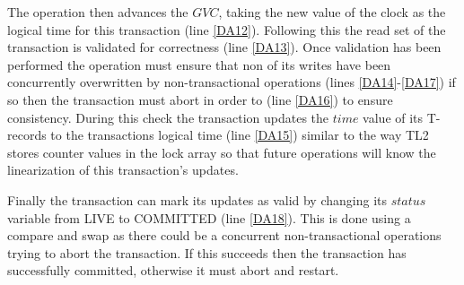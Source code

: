 \documentclass[11pt,letterpaper]{article}
\begin{document}
The operation then advances the $\mathit{GVC}$, taking the
new value of the clock as the logical time for this transaction (line \ref{DA12}).
Following this the read set of the transaction is validated for
correctness (line \ref{DA13}).
Once validation has been performed the operation must
ensure that non of its writes have been concurrently
overwritten by non-transactional operations (lines \ref{DA14}-\ref{DA17})
if so then the transaction must abort in order to (line \ref{DA16}) to ensure consistency.
During this check the transaction updates the $\mathit{time}$
value of its T-records to the transactions logical time (line \ref{DA15})
similar to the way TL2 stores counter values in the lock array
so that future operations will know the linearization of this transaction's updates.

Finally the
transaction can mark its updates as valid by 
changing its 
$\mathit{status}$ variable from LIVE to COMMITTED (line \ref{DA18}).
This is done using a compare and swap as there could be
a concurrent non-transactional operations trying to abort the transaction.  
If this succeeds then the transaction has successfully committed, otherwise
it must abort and restart.
\end{document}
